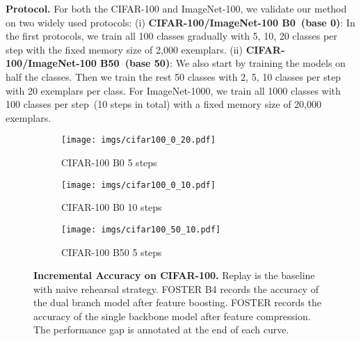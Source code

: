 \documentclass[runningheads]{llncs}
\begin{document}
\noindent\textbf{Protocol.}
For both the CIFAR-100 and ImageNet-100, we validate our method on two widely used protocols: \textrm{(i)} \textbf{CIFAR-100/ImageNet-100 B0~(base 0)}: In the first protocols, we train all 100 classes gradually with 5, 10, 20 classes per step with the fixed memory size of 2,000 exemplars. (\textrm{ii}) \textbf{CIFAR-100/ImageNet-100 B50~(base 50)}: We also start by training the models on half the classes. Then we train the rest 50 classes with 2, 5, 10 classes per step with 20 exemplars per class. For ImageNet-1000, we train all 1000 classes with 100 classes per step~(10 steps in total) with a fixed memory size of 20,000 exemplars.
\begin{figure*}[t]
  \centering
  \begin{subfigure}[b]{0.32\linewidth}
    \texttt{[image: imgs/cifar100\_0\_20.pdf]}
    \caption{\scriptsize CIFAR-100 B0 5 steps}
    \label{fig:cifar_inc1}
  \end{subfigure}
  \hfill
  \begin{subfigure}[b]{0.32\linewidth}
    \texttt{[image: imgs/cifar100\_0\_10.pdf]}
    \caption{\scriptsize CIFAR-100 B0 10 steps}
    \label{fig:cifar_inc2}
  \end{subfigure}
   \hfill
  \begin{subfigure}[b]{0.32\linewidth}
    \texttt{[image: imgs/cifar100\_50\_10.pdf]}
    \caption{\scriptsize CIFAR-100 B50 5 steps}
    \label{fig:cifar_inc3}
  \end{subfigure}
  \caption{\small  \textbf{Incremental Accuracy on CIFAR-100.} Replay is the baseline with naive rehearsal strategy. FOSTER B4 records the accuracy of the dual branch model after feature boosting. FOSTER records the accuracy of the single backbone model after feature compression. The performance gap is annotated at the end of each curve.}
  \label{fig:cifar100}
\end{figure*}
\end{document}
